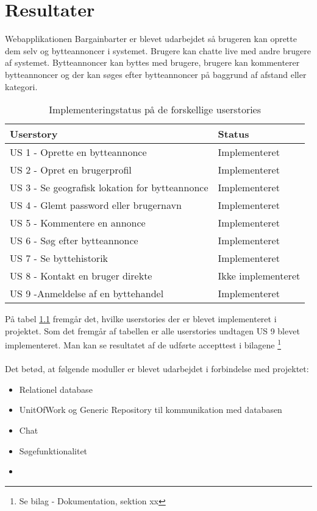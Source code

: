 \chapter{Resultater}\label{ch:Resultat og Diskussion}
Webapplikationen Bargainbarter er blevet udarbejdet så brugeren kan oprette dem selv og bytteannoncer i systemet. Brugere kan chatte live med andre brugere af systemet. Bytteannoncer kan byttes med brugere, brugere kan kommenterer bytteannoncer og der kan søges efter bytteannoncer på baggrund af afstand eller kategori.

\begin{table}[H]
	\begin{tabular}{ | l | p{5cm} |}
		\hline
		\textbf{Userstory}  & \textbf{Status} \\ \hline
		US 1 - Oprette en bytteannonce  & Implementeret \\ \hline
		US 2 - Opret en brugerprofil & Implementeret \\ \hline
		US 3 - Se geografisk lokation for bytteannonce & Implementeret \\ \hline
		US 4 - Glemt password eller brugernavn & Implementeret \\ \hline
		US 5 - Kommentere en annonce & Implementeret \\ \hline
		US 6 - Søg efter bytteannonce & Implementeret \\ \hline
		US 7 - Se byttehistorik & Implementeret \\ \hline	
		US 8 - Kontakt en bruger direkte & Ikke implementeret \\ \hline	
		US 9 -Anmeldelse af en byttehandel & Implementeret \\ \hline	
	\end{tabular}
\caption{Implementeringstatus på de forskellige userstories}
\label{fig:Implementeringsstatus}
\end{table}

På tabel \ref{fig:Implementeringsstatus} fremgår det, hvilke userstories der er blevet implementeret i projektet. Som det fremgår af tabellen er alle userstories undtagen  US 9 blevet implementeret. Man kan se resultatet af de udførte accepttest i bilagene \footnote{Se bilag - Dokumentation, sektion xx}
\\ \\
\noindent Det betød, at følgende moduller er blevet udarbejdet i forbindelse med projektet:

\begin{itemize}
	\item Relationel database
	\item UnitOfWork og Generic Repository til kommunikation med databasen
	\item Chat 
	\item Søgefunktionalitet
	\item 
\end{itemize}
